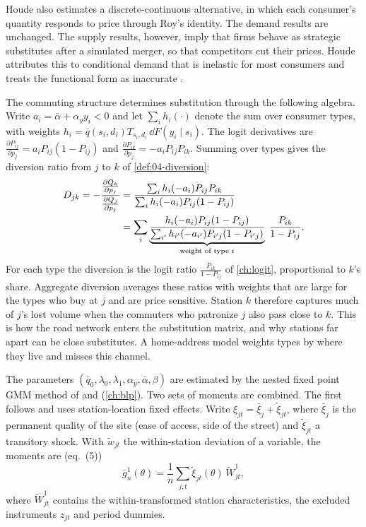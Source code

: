 Houde also estimates a discrete-continuous alternative, in which each consumer's quantity responds to price through
Roy's identity. The demand results are unchanged. The supply results, however, imply that firms behave as strategic
substitutes after a simulated merger, so that competitors cut their prices. Houde attributes this to conditional
demand that is inelastic for most consumers and treats the functional form as inaccurate \citep[p.~2157,
n.~24]{Houde2012}.

The commuting structure determines substitution through the following algebra. Write $a_i = \bar\alpha + \alpha_y
y_i < 0$ and let $\sum_i h_i(\cdot)$ denote the sum over consumer types, with weights $h_i = \bar q(s_i,d_i)
T_{s_i,d_i}\,\dd F(y_i \mid s_i)$. The logit derivatives are $\frac{\partial P_{ij}}{\partial p_j} = a_i P_{ij}(1 -
P_{ij})$ and $\frac{\partial P_{ik}}{\partial p_j} = -a_i P_{ij}P_{ik}$. Summing over types gives the diversion
ratio from $j$ to $k$ of \cref{def:04-diversion}:
\begin{align}
D_{jk}
= -\dfrac{\frac{\partial Q_k}{\partial p_j}}{\frac{\partial Q_j}{\partial p_j}}
&=\frac{\sum_i h_i (-a_i) P_{ij} P_{ik}}{\sum_i h_i (-a_i) P_{ij}(1 - P_{ij})} \notag\\
&= \sum_i \underbrace{\frac{h_i (-a_i) P_{ij}(1 - P_{ij})}{\sum_{i'} h_{i'} (-a_{i'}) P_{i'j}(1 -
P_{i'j})}}_{\text{weight of type } i}\; \frac{P_{ik}}{1 - P_{ij}} . \label{eq:11-houde-diversion}
\end{align}
For each type the diversion is the logit ratio $\frac{P_{ik}}{1 - P_{ij}}$ of \cref{ch:logit}, proportional to $k$'s
share. Aggregate diversion averages these ratios with weights that are large for the types who buy at $j$ and are
price sensitive. Station $k$ therefore captures much of $j$'s lost volume when the commuters who patronize $j$ also
pass close to $k$. This is how the road network enters the substitution matrix, and why stations far apart can be
close substitutes. A home-address model weights types by where they live and misses this channel.

The parameters $(\bar q_0, \lambda_0, \lambda_1, \alpha_y, \bar\alpha, \beta)$ are estimated by the nested fixed point
GMM method of \citet{Berry1994} and \citet{BerryLevinsohnPakes1995} (\cref{ch:blp}). Two sets of moments are combined.
The first follows \citet{Nevo2001} and uses station-location fixed effects. Write $\xi_{jt} = \bar\xi_j +
\tilde\xi_{jt}$, where $\bar\xi_j$ is the permanent quality of the site (ease of access, side of the street) and
$\tilde\xi_{jt}$ a transitory shock. With $\tilde w_{jt}$ the within-station deviation of a variable, the moments are
(eq.~(5))
\begin{equation}\label{eq:11-houde-m1}
\bar g^1_n(\theta) = \frac{1}{n}\sum_{j,t}\tilde\xi_{jt}(\theta)\,\tilde W^1_{jt},
\end{equation}
where $\tilde W^1_{jt}$ contains the within-transformed station characteristics, the excluded instruments $z_{jt}$
and period dummies.

